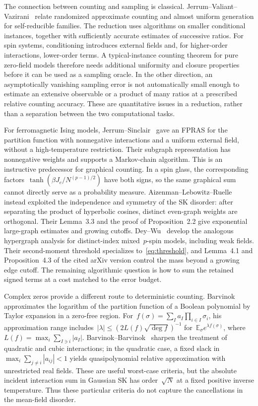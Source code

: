 \documentclass[10pt]{article}
\theoremstyle{plain}
\theoremstyle{definition}
\theoremstyle{remark}
\begin{document}
The connection between counting and sampling is classical. Jerrum--Valiant--Vazirani~\cite[Section~6]{JVV86} relate randomized approximate counting and almost uniform generation for self-reducible families. The reduction uses algorithms on smaller conditional instances, together with sufficiently accurate estimates of successive ratios. For spin systems, conditioning introduces external fields and, for higher-order interactions, lower-order terms. A typical-instance counting theorem for pure zero-field models therefore needs additional uniformity and closure properties before it can be used as a sampling oracle. In the other direction, an asymptotically vanishing sampling error is not automatically small enough to estimate an extensive observable or a product of many ratios at a prescribed relative counting accuracy. These are quantitative issues in a reduction, rather than a separation between the two computational tasks.

For ferromagnetic Ising models, Jerrum--Sinclair~\cite{JS93} gave an FPRAS for the partition function with nonnegative interactions and a uniform external field, without a high-temperature restriction. Their subgraph representation has nonnegative weights and supports a Markov-chain algorithm. This is an instructive predecessor for graphical counting. In a spin glass, the corresponding factors~$\tanh(\beta J_e/N^{(p-1)/2})$ have both signs, so the same graphical sum cannot directly serve as a probability measure. Aizenman--Lebowitz--Ruelle~\cite{ALR87} instead exploited the independence and symmetry of the SK disorder: after separating the product of hyperbolic cosines, distinct even-graph weights are orthogonal. Their Lemma~3.3 and the proof of Proposition~2.2 give exponential large-graph estimates and growing cutoffs. Dey--Wu~\cite{DW26} develop the analogous hypergraph analysis for distinct-index mixed~$p$-spin models, including weak fields. Their second-moment threshold specializes to~\eqref{eq:threshold}, and Lemma~4.1 and Proposition~4.3 of the cited arXiv version control the mass beyond a growing edge cutoff. The remaining algorithmic question is how to sum the retained signed terms at a cost matched to the error budget.

Complex zeros provide a different route to deterministic counting. Barvinok~\cite{Bar17} approximates the logarithm of the partition function of a Boolean polynomial by Taylor expansion in a zero-free region. For~$f(\sigma)=\sum_I a_I\prod_{i\in I}\sigma_i$, his approximation range includes~$|\lambda|\le(2L(f)\sqrt{\deg f})^{-1}$ for~$\mathbb E_\sigma e^{\lambda f(\sigma)}$, where~$L(f)=\max_i\sum_{I\ni i}|a_I|$. Barvinok--Barvinok~\cite{BB21} sharpen the treatment of quadratic and cubic interactions; in the quadratic case, a fixed slack in~$\max_i\sum_{j\ne i}|a_{ij}|<1$ yields quasipolynomial relative approximation with unrestricted real fields. These are useful worst-case criteria, but the absolute incident interaction sum in Gaussian SK has order~$\sqrt N$ at a fixed positive inverse temperature. Thus these particular criteria do not capture the cancellations in the mean-field disorder.
\end{document}
